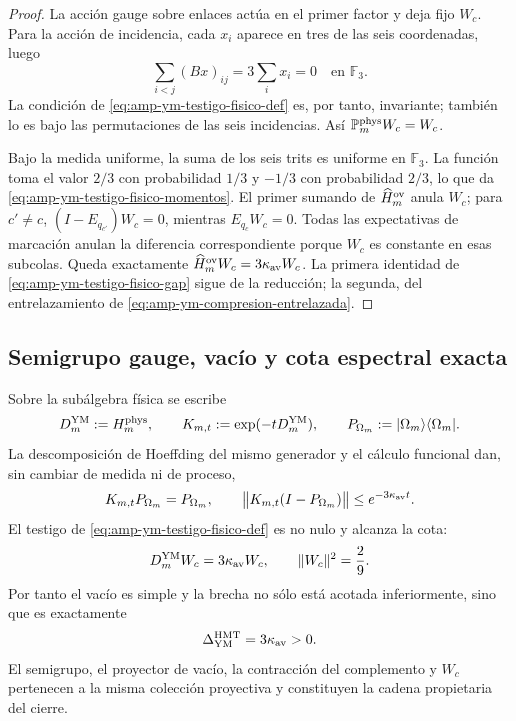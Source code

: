 \begin{proof}
La acción gauge sobre enlaces actúa en el primer factor y deja fijo
\(W_c\). Para la acción de incidencia, cada \(x_i\) aparece en tres de las
seis coordenadas, luego
\[
 \sum_{i<j}(Bx)_{ij}=3\sum_i x_i=0
 \quad\text{en }\mathbb F_3.
\]
La condición de \eqref{eq:amp-ym-testigo-fisico-def} es, por tanto,
invariante; también lo es bajo las permutaciones de las seis incidencias.
Así \(\mathbb P_m^{\rm phys}W_c=W_c\).

Bajo la medida uniforme, la suma de los seis trits es uniforme en
\(\mathbb F_3\). La función toma el valor \(2/3\) con probabilidad \(1/3\)
y \(-1/3\) con probabilidad \(2/3\), lo que da
\eqref{eq:amp-ym-testigo-fisico-momentos}. El primer sumando de
\(\widehat H_m^{\rm ov}\) anula \(W_c\); para \(c'\ne c\),
\((I-E_{q_{c'}})W_c=0\), mientras
\(E_{q_c}W_c=0\). Todas las expectativas de marcación anulan la
diferencia correspondiente porque \(W_c\) es constante en esas subcolas.
Queda exactamente
\(\widehat H_m^{\rm ov}W_c=3\kappa_{\rm av}W_c\). La primera identidad de
\eqref{eq:amp-ym-testigo-fisico-gap} sigue de la reducción; la segunda,
del entrelazamiento de \eqref{eq:amp-ym-compresion-entrelazada}.
\end{proof}

\subsection*{Semigrupo gauge, vacío y cota espectral exacta}

Sobre la subálgebra física se escribe
\[
 D_m^{\rm YM}:=H_m^{\rm phys},\qquad
 K_{m,t}:=\exp(-tD_m^{\rm YM}),\qquad
 P_{\Omega_m}:=|\Omega_m\rangle\langle\Omega_m|.
\]
La descomposición de Hoeffding del mismo generador y el cálculo funcional
dan, sin cambiar de medida ni de proceso,
\begin{equation}\label{eq:amp-ym-owner-semigrupo-vacio}
 K_{m,t}P_{\Omega_m}=P_{\Omega_m},
 \qquad
 \bigl\|K_{m,t}(I-P_{\Omega_m})\bigr\|
 \leq e^{-3\kappa_{\rm av}t}.
\end{equation}
El testigo de \eqref{eq:amp-ym-testigo-fisico-def} es no nulo y alcanza la
cota:
\begin{equation}\label{eq:amp-ym-owner-testigo-wc}
 D_m^{\rm YM}W_c=3\kappa_{\rm av}W_c,
 \qquad \|W_c\|^2=\frac29.
\end{equation}
Por tanto el vacío es simple y la brecha no sólo está acotada inferiormente,
sino que es exactamente
\begin{equation}\label{eq:amp-ym-owner-brecha-exacta}
 \Delta_{\rm YM}^{\rm HMT}=3\kappa_{\rm av}>0.
\end{equation}
El semigrupo, el proyector de vacío, la contracción del complemento y
\(W_c\) pertenecen a la misma colección proyectiva y constituyen la cadena
propietaria del cierre.

